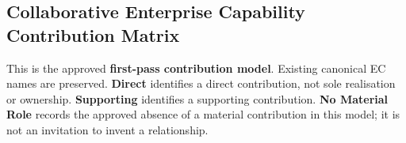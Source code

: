 \label{rad:assurance-strategy:54}
\subsection*{Collaborative Enterprise Capability Contribution Matrix}
\label{rad:assurance-strategy:56}

This is the approved \textbf{first-pass contribution model}. Existing canonical EC names are preserved. \textbf{Direct} identifies a direct contribution, not sole realisation or ownership. \textbf{Supporting} identifies a supporting contribution. \textbf{No Material Role} records the approved absence of a material contribution in this model; it is not an invitation to invent a relationship.

\label{rad:assurance-strategy:58}
\begingroup\small\setlength{\TableWidth}{\dimexpr\linewidth-8\tabcolsep-5\arrayrulewidth\relax}

